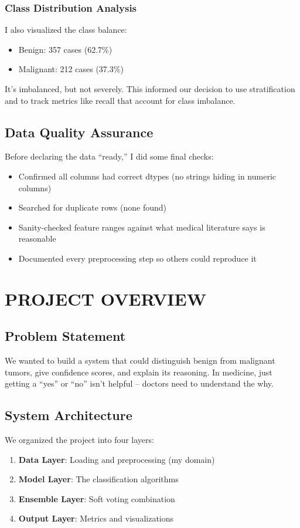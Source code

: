 \documentclass[12pt]{article}
\begin{document}
\subsubsection{Class Distribution Analysis}
I also visualized the class balance:
\begin{itemize}
    \item Benign: 357 cases (62.7\%)
    \item Malignant: 212 cases (37.3\%)
\end{itemize}

It's imbalanced, but not severely. This informed our decision to use stratification and to track metrics like recall that account for class imbalance.

\subsection{Data Quality Assurance}

Before declaring the data ``ready,'' I did some final checks:
\begin{itemize}
    \item Confirmed all columns had correct dtypes (no strings hiding in numeric columns)
    \item Searched for duplicate rows (none found)
    \item Sanity-checked feature ranges against what medical literature says is reasonable
    \item Documented every preprocessing step so others could reproduce it
\end{itemize}

\newpage
\section{PROJECT OVERVIEW}

\subsection{Problem Statement}
We wanted to build a system that could distinguish benign from malignant tumors, give confidence scores, and explain its reasoning. In medicine, just getting a ``yes'' or ``no'' isn't helpful -- doctors need to understand the why.

\subsection{System Architecture}
We organized the project into four layers:
\begin{enumerate}
    \item \textbf{Data Layer}: Loading and preprocessing (my domain)
    \item \textbf{Model Layer}: The classification algorithms
    \item \textbf{Ensemble Layer}: Soft voting combination
    \item \textbf{Output Layer}: Metrics and visualizations
\end{enumerate}
\end{document}
